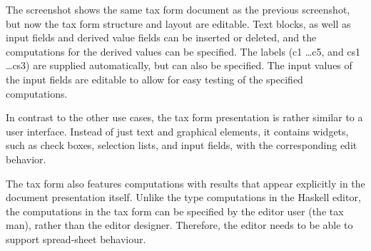 
The screenshot shows the same tax form document as the previous screenshot, but now the tax form structure and layout are editable. Text blocks, as well as input fields and derived value fields can be inserted or deleted, and the computations for the derived values can be specified. The labels (c1 \dots c5, and cs1 \dots cs3) are supplied automatically, but can also be specified. The input values of the input fields are editable to allow for easy testing of the specified computations. 



In contrast to the other use cases, the tax form presentation is rather similar to a user interface. Instead of just text and graphical elements, it contains widgets, such as check boxes, selection lists, and input fields, with the corresponding edit behavior.

The tax form also features computations with results that appear explicitly in the document presentation itself. Unlike the type computations in the Haskell editor, the computations in the tax form can be specified by the editor user (the tax man), rather than the editor designer. Therefore, the editor needs to be able to support spread-sheet behaviour.


